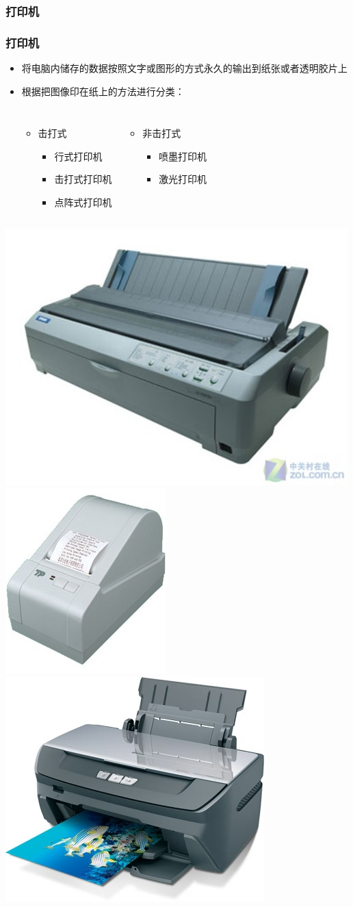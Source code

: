 \documentclass{beamer}
\begin{document}
\subsubsection{打印机}
\begin{frame}
	\frametitle{打印机}
	\beamertemplatetransparentcovereddynamicmedium
	\begin{itemize}[<+->]
		\item 将电脑内储存的数据按照文字或图形的方式永久的输出到纸张或者透明胶片上
		\item 根据把图像印在纸上的方法进行分类：
		\begin{columns}
		\begin{itemize}
			\item 击打式
			\begin{itemize}
				\item 行式打印机%
				\item 击打式打印机%
				\item 点阵式打印机%
			\end{itemize}
		\end{itemize}
		\begin{itemize}
			\item 非击打式
			\begin{itemize}
				\item 喷墨打印机
				\item 激光打印机
			\end{itemize}
		\end{itemize}
		\end{columns}
	\end{itemize}
	\begin{center}
	\includegraphics[width=.3\textwidth]{images/pin-printer.jpg} 
	\includegraphics[width=.1\textwidth]{images/ticket-printer.jpg} 
	\includegraphics[width=.2\textwidth]{images/color-bj-printer.jpg} 

\end{center}
\end{frame}
\end{document}

